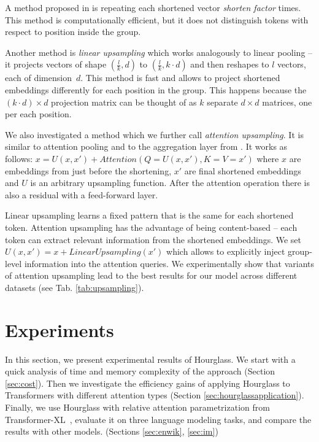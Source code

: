 \documentclass[11pt]{article}
\begin{document}
A method proposed in \cite{dai2020funneltransformer} is repeating each shortened vector \emph{shorten factor} times. This method is computationally efficient, but it does not distinguish tokens with respect to position inside the group. 

Another method is \emph{linear upsampling} which works analogously to linear pooling -- it projects vectors of shape $(\frac{l}{k}, d)$ to $(\frac{l}{k}, k \cdot d)$ and then reshapes to $l$ vectors, each of dimension~$d$. This method is fast and allows to project shortened embeddings differently for each position in the group. This happens because the $(k \cdot d) \times d$ projection matrix can be thought of as $k$ separate $d \times d$ matrices, one per each position. 

We also investigated a method which we further call \emph{attention upsampling}. It is similar to attention pooling \cite{dai2020funneltransformer} and to the aggregation layer from \cite{subramanian2020multiscale}. It works as follows: $x = U(x, x') + Attention(Q = U(x, x'), K = V = x')$ where $x$ are embeddings from just before the shortening, $x'$ are final shortened embeddings and $U$ is an arbitrary upsampling function. After the attention operation there is also a residual with a feed-forward layer.

Linear upsampling learns a fixed pattern that is the same for each shortened token. Attention upsampling has the advantage of being content-based -- each token can extract relevant information from the shortened embeddings. We set $U(x, x') = x + LinearUpsampling(x')$ which allows to explicitly inject group-level information into the attention queries. We experimentally show that variants of attention upsampling lead to the best results for our model across different datasets (see Tab. \ref{tab:upsampling}).

\section{Experiments}

In this section, we present experimental results of Hourglass. We start with a quick analysis of time and memory complexity of the approach (Section \ref{sec:cost}). Then we investigate the efficiency gains of applying Hourglass to Transformers with different attention types (Section \ref{sec:hourglassapplication}). Finally, we use Hourglass with relative attention parametrization from Transformer-XL~\cite{dai2019transformerxl}, evaluate it on three language modeling tasks, and compare the results with other models. (Sections \ref{sec:enwik}, \ref{sec:im})
\end{document}
